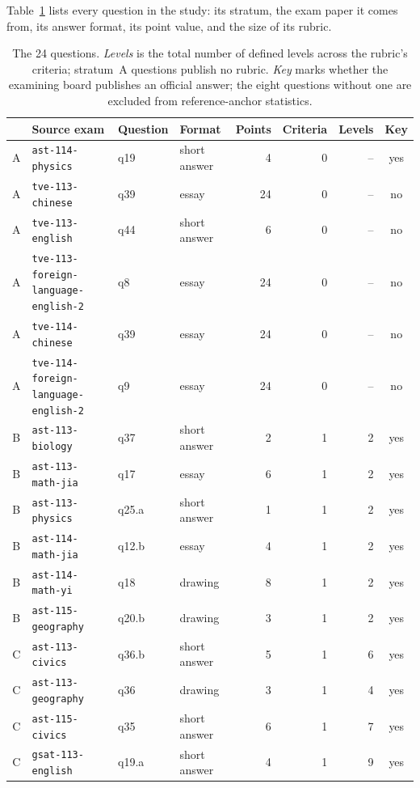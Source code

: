\documentclass{article}
\begin{document}
Table~\ref{tab:questions} lists every question in the study: its stratum, the
exam paper it comes from, its answer format, its point value, and the size of
its rubric.

\begin{table}[!ht]
\centering\footnotesize
\caption{The 24 questions. \emph{Levels} is the total number of defined
levels across the rubric's criteria; stratum~A questions publish no rubric.
\emph{Key} marks whether the examining board publishes an official answer;
the eight questions without one are excluded from reference-anchor
statistics.}
\label{tab:questions}
\setlength{\tabcolsep}{3.5pt}
\begin{tabular}{@{}clllrrrc@{}}
\toprule
& \textbf{Source exam} & \textbf{Question} & \textbf{Format}
& \textbf{Points} & \textbf{Criteria} & \textbf{Levels} & \textbf{Key} \\
\midrule
A & \texttt{ast-114-physics} & q19 & short answer & 4 & 0 & -- & yes \\
A & \texttt{tve-113-chinese} & q39 & essay & 24 & 0 & -- & no \\
A & \texttt{tve-113-english} & q44 & short answer & 6 & 0 & -- & no \\
A & \texttt{tve-113-foreign-language-english-2} & q8 & essay & 24 & 0 & -- & no \\
A & \texttt{tve-114-chinese} & q39 & essay & 24 & 0 & -- & no \\
A & \texttt{tve-114-foreign-language-english-2} & q9 & essay & 24 & 0 & -- & no \\
\midrule
B & \texttt{ast-113-biology} & q37 & short answer & 2 & 1 & 2 & yes \\
B & \texttt{ast-113-math-jia} & q17 & essay & 6 & 1 & 2 & yes \\
B & \texttt{ast-113-physics} & q25.a & short answer & 1 & 1 & 2 & yes \\
B & \texttt{ast-114-math-jia} & q12.b & essay & 4 & 1 & 2 & yes \\
B & \texttt{ast-114-math-yi} & q18 & drawing & 8 & 1 & 2 & yes \\
B & \texttt{ast-115-geography} & q20.b & drawing & 3 & 1 & 2 & yes \\
\midrule
C & \texttt{ast-113-civics} & q36.b & short answer & 5 & 1 & 6 & yes \\
C & \texttt{ast-113-geography} & q36 & drawing & 3 & 1 & 4 & yes \\
C & \texttt{ast-115-civics} & q35 & short answer & 6 & 1 & 7 & yes \\
C & \texttt{gsat-113-english} & q19.a & short answer & 4 & 1 & 9 & yes \\

\end{tabular}
\end{table}
\end{document}

